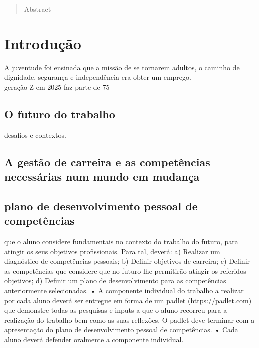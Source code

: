 

\tableofcontents
\appendix
\pagestyle{plain} %
\setlength{\parindent}{0in}
\label{Resumo}
\begin{abstract}
Abstract
\end{abstract}
\newpage
\section{Introdução}
\qquad A juventude foi ensinada que a missão de se tornarem adultos, o caminho de dignidade, segurança e independência era obter um emprego.\\






geração Z em 2025 faz parte de 75%



\subsection{O futuro do trabalho}

desafios e contextos.

\subsection{A gestão de carreira e as competências necessárias num mundo em mudança}





\subsection{plano de desenvolvimento pessoal de competências}

que o aluno considere
fundamentais no contexto do trabalho do futuro, para atingir os seus objetivos
profissionais. Para tal, deverá:
a) Realizar um diagnóstico de competências pessoais;
b) Definir objetivos de carreira;
c) Definir as competências que considere que no futuro lhe permitirão atingir os
referidos objetivos;
d) Definir um plano de desenvolvimento para as competências anteriormente
selecionadas.
• A componente individual do trabalho a realizar por cada aluno deverá ser entregue em forma de um padlet (https://padlet.com) que demonstre todas as pesquisas e inputs a que o aluno recorreu para a realização do trabalho bem como as suas reflexões. O padlet deve terminar com a apresentação do plano de
desenvolvimento pessoal de competências.
• Cada aluno deverá defender oralmente a componente individual.


